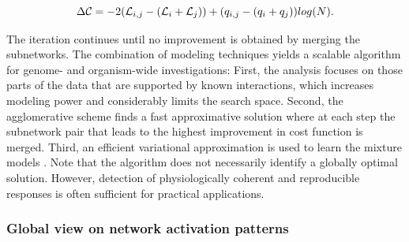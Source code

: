 \begin{equation}\label{eq:netreponsecost}
  \Delta\mathcal{C} = - 2({\cal L}_{i,j} - ({\cal L}_i + {\cal L}_j)) + (q_{i,j} - (q_i + q_j))log(N). 
\end{equation}

The iteration continues until no improvement is obtained by merging
the subnetworks. The combination of modeling techniques yields a
scalable algorithm for genome- and organism-wide investigations:
First, the analysis focuses on those parts of the data that are
supported by known interactions, which increases modeling power and
considerably limits the search space. Second, the agglomerative scheme
finds a fast approximative solution where at each step the subnetwork
pair that leads to the highest improvement in cost function is
merged. Third, an efficient variational approximation is used to learn
the mixture models \citep{Kurihara07nips}. Note that the algorithm
does not necessarily identify a globally optimal solution. However,
detection of physiologically coherent and reproducible responses is
often sufficient for practical applications.

\subsubsection{Global view on network activation patterns}

